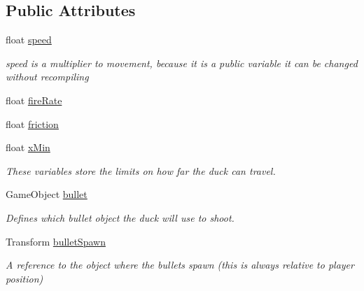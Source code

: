 \subsection*{Public Attributes}
\begin{DoxyCompactItemize}
\item 
\mbox{\label{class_player_controller_a0928605583f0563cd84fe43119d336ec}} 
float \mbox{\hyperlink{class_player_controller_a0928605583f0563cd84fe43119d336ec}{speed}}
\begin{DoxyCompactList}\small\item\em speed is a multiplier to movement, because it is a public variable it can be changed without recompiling \end{DoxyCompactList}\item 
float \mbox{\hyperlink{class_player_controller_aec1e8f25c69ea198fe38f965307437a4}{fire\+Rate}}
\item 
float \mbox{\hyperlink{class_player_controller_a22510e0221512fb7fe06808912fa1a55}{friction}}
\item 
\mbox{\label{class_player_controller_a373cbc1dfe44cb185a84422b4a56bf9b}} 
float \mbox{\hyperlink{class_player_controller_a373cbc1dfe44cb185a84422b4a56bf9b}{x\+Min}}
\begin{DoxyCompactList}\small\item\em These variables store the limits on how far the duck can travel. \end{DoxyCompactList}\item 
\mbox{\label{class_player_controller_a47d9b8f67993f190c8f170bc3f134ee6}} 
Game\+Object \mbox{\hyperlink{class_player_controller_a47d9b8f67993f190c8f170bc3f134ee6}{bullet}}
\begin{DoxyCompactList}\small\item\em Defines which bullet object the duck will use to shoot. \end{DoxyCompactList}\item 
\mbox{\label{class_player_controller_a45263a41dbdfe88658e0b58196aeba98}} 
Transform \mbox{\hyperlink{class_player_controller_a45263a41dbdfe88658e0b58196aeba98}{bullet\+Spawn}}
\begin{DoxyCompactList}\small\item\em A reference to the object where the bullets spawn (this is always relative to player position) \end{DoxyCompactList}\item 

\end{DoxyCompactItemize}
